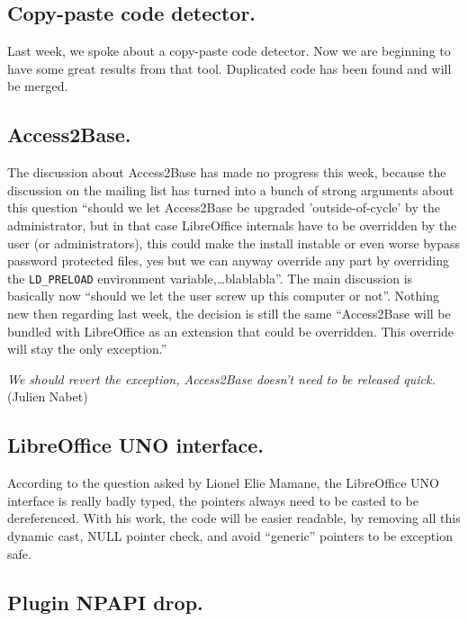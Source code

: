 \documentclass{article}
\begin{document}
\subsection{Copy-paste code detector.}

Last week, we spoke about a copy-paste code detector. Now we are beginning to have some great results from that tool. Duplicated code has been found and will be merged\cite{duplicateFound}.

\subsection{Access2Base.}

The discussion about Access2Base has made no progress this week, because the discussion on the mailing list has turned into a bunch of strong arguments about this question ``should we let Access2Base be upgraded 'outside-of-cycle' by the administrator, but in that case LibreOffice internals have to be overridden by the user (or administrators), this could make the install instable or even worse bypass password protected files, yes but we can anyway override any part by overriding the \lstinline|LD_PRELOAD| environment variable,\ldots blablabla''. The main discussion is basically now ``should we let the user screw up this computer or not''. Nothing new then regarding last week, the decision is still the same ``Access2Base will be bundled with LibreOffice as an extension that could be overridden. This override will stay the only exception.''

\emph{We should revert the exception, Access2Base doesn't need to be released quick.} (Julien Nabet)

\subsection{LibreOffice UNO interface.}

According to the question asked by Lionel Elie Mamane, the LibreOffice UNO interface\cite{unoInterface} is really badly typed, the pointers always need to be casted to be dereferenced. With his work, the code will be easier readable, by removing all this dynamic cast, NULL pointer check, and avoid ``generic'' pointers to be exception safe\cite{unoTypeRefactor}.

\subsection{Plugin NPAPI drop.}
\end{document}

